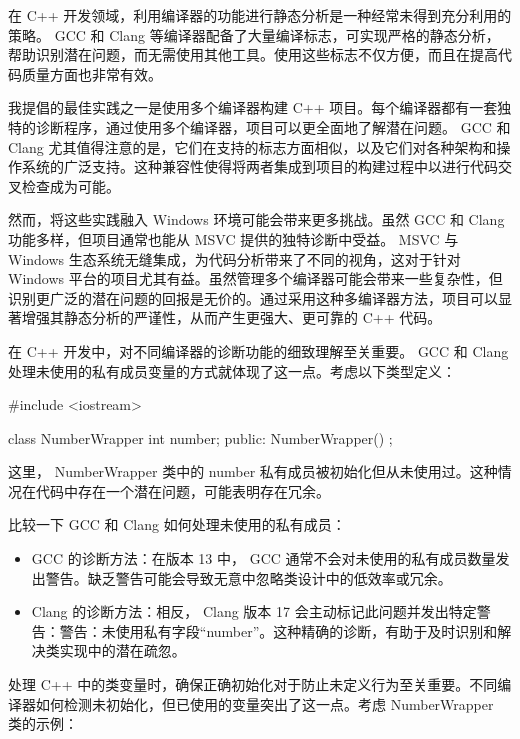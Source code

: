 
在 C++ 开发领域，利用编译器的功能进行静态分析是一种经常未得到充分利用的策略。 GCC 和 Clang 等编译器配备了大量编译标志，可实现严格的静态分析，帮助识别潜在问题，而无需使用其他工具。使用这些标志不仅方便，而且在提高代码质量方面也非常有效。

我提倡的最佳实践之一是使用多个编译器构建 C++ 项目。每个编译器都有一套独特的诊断程序，通过使用多个编译器，项目可以更全面地了解潜在问题。 GCC 和 Clang 尤其值得注意的是，它们在支持的标志方面相似，以及它们对各种架构和操作系统的广泛支持。这种兼容性使得将两者集成到项目的构建过程中以进行代码交叉检查成为可能。

然而，将这些实践融入 Windows 环境可能会带来更多挑战。虽然 GCC 和 Clang 功能多样，但项目通常也能从 MSVC 提供的独特诊断中受益。 MSVC 与 Windows 生态系统无缝集成，为代码分析带来了不同的视角，这对于针对 Windows 平台的项目尤其有益。虽然管理多个编译器可能会带来一些复杂性，但识别更广泛的潜在问题的回报是无价的。通过采用这种多编译器方法，项目可以显著增强其静态分析的严谨性，从而产生更强大、更可靠的 C++ 代码。


在 C++ 开发中，对不同编译器的诊断功能的细致理解至关重要。 GCC 和 Clang 处理未使用的私有成员变量的方式就体现了这一点。考虑以下类型定义：

\begin{cpp}
#include <iostream>

class NumberWrapper {
    int number;
    public:
    NumberWrapper() {
    }
};
\end{cpp}

这里， NumberWrapper 类中的 number 私有成员被初始化但从未使用过。这种情况在代码中存在一个潜在问题，可能表明存在冗余。

比较一下 GCC 和 Clang 如何处理未使用的私有成员：

\begin{itemize}
\item
GCC 的诊断方法：在版本 13 中， GCC 通常不会对未使用的私有成员数量发出警告。缺乏警告可能会导致无意中忽略类设计中的低效率或冗余。

\item
Clang 的诊断方法：相反， Clang 版本 17 会主动标记此问题并发出特定警告：警告：未使用私有字段“number”。这种精确的诊断，有助于及时识别和解决类实现中的潜在疏忽。
\end{itemize}


处理 C++ 中的类变量时，确保正确初始化对于防止未定义行为至关重要。不同编译器如何检测未初始化，但已使用的变量突出了这一点。考虑 NumberWrapper 类的示例：

